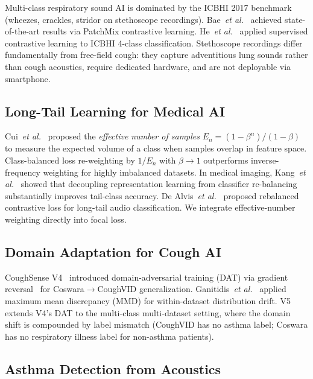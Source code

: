 \documentclass[journal]{IEEEtran}
\begin{document}
Multi-class respiratory sound AI is dominated by the ICBHI 2017
benchmark~\cite{icbhi2017} (wheezes, crackles, stridor on stethoscope
recordings). Bae~\textit{et al.}\ \cite{patchmix} achieved
state-of-the-art results via PatchMix contrastive learning.
He~\textit{et al.}~\cite{scl_resp} applied supervised contrastive
learning to ICBHI 4-class classification. Stethoscope recordings
differ fundamentally from free-field cough: they capture
adventitious lung sounds rather than cough acoustics, require
dedicated hardware, and are not deployable via smartphone.

\subsection{Long-Tail Learning for Medical AI}

Cui~\textit{et al.}\ \cite{effectivenum} proposed the
\emph{effective number of samples} $E_n = (1-\beta^n)/(1-\beta)$
to measure the expected volume of a class when samples overlap in
feature space. Class-balanced loss re-weighting by $1/E_n$ with
$\beta \to 1$ outperforms inverse-frequency weighting for highly
imbalanced datasets. In medical imaging, Kang~\textit{et al.}\
\cite{decoupling2020} showed that decoupling representation learning
from classifier re-balancing substantially improves tail-class
accuracy. De Alvis~\textit{et al.}\ \cite{rcl2024} proposed
rebalanced contrastive loss for long-tail audio classification.
We integrate effective-number weighting directly into focal loss.

\subsection{Domain Adaptation for Cough AI}

CoughSense V4~\cite{v4report} introduced domain-adversarial training
(DAT) via gradient reversal~\cite{ganin2016} for Coswara$\to$CoughVID
generalization. Ganitidis~\textit{et al.}\ \cite{ganitidis2025}
applied maximum mean discrepancy (MMD) for within-dataset distribution
drift. V5 extends V4's DAT to the multi-class multi-dataset setting,
where the domain shift is compounded by label mismatch (CoughVID has
no asthma label; Coswara has no respiratory illness label for
non-asthma patients).

\subsection{Asthma Detection from Acoustics}
\end{document}
